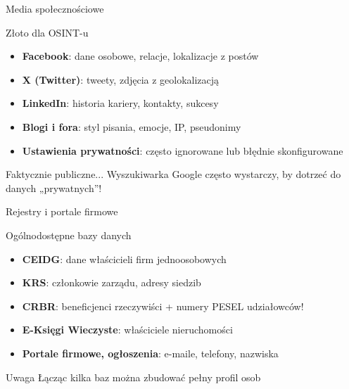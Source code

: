 \begin{frame}{Media społecznościowe}
\begin{block}{Złoto dla OSINT-u}
\begin{itemize}
  \item \textbf{Facebook}: dane osobowe, relacje, lokalizacje z postów
  \item \textbf{X (Twitter)}: tweety, zdjęcia z geolokalizacją
  \item \textbf{LinkedIn}: historia kariery, kontakty, sukcesy
  \item \textbf{Blogi i fora}: styl pisania, emocje, IP, pseudonimy
  \item \textbf{Ustawienia prywatności}: często ignorowane lub błędnie skonfigurowane \cite{zrodlo} \cite{zrodloArtykul}
\end{itemize}
\end{block}
\pause
\begin{exampleblock}{Faktycznie publiczne...}
Wyszukiwarka Google często wystarczy, by dotrzeć do danych „prywatnych”!
\end{exampleblock}
\end{frame}

\begin{frame}{Rejestry i portale firmowe}
\begin{block}{Ogólnodostępne bazy danych}
\begin{itemize}
  \item \textbf{CEIDG}: dane właścicieli firm jednoosobowych
  \item \textbf{KRS}: członkowie zarządu, adresy siedzib
  \item \textbf{CRBR}: beneficjenci rzeczywiści + numery PESEL udziałowców!
  \item \textbf{E-Księgi Wieczyste}: właściciele nieruchomości
  \item \textbf{Portale firmowe, ogłoszenia}: e-maile, telefony, nazwiska \cite{zrodloDzialalnosc}
\end{itemize}
\end{block}
\pause
\begin{alertblock}{Uwaga}
Łącząc kilka baz można zbudować pełny profil osob
\end{alertblock}
\end{frame}

